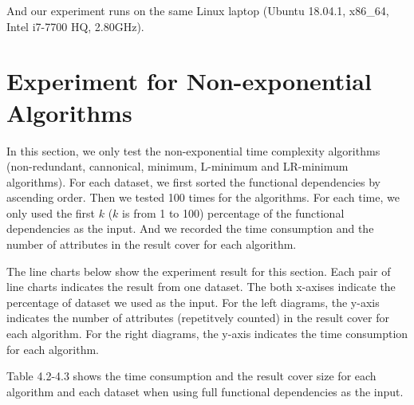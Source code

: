 \documentclass[11pt]{book}
\begin{document}
And our experiment runs on the same Linux laptop (Ubuntu 18.04.1, x86\_64, Intel i7-7700 HQ, 2.80GHz).

\section{Experiment for Non-exponential Algorithms}

In this section, we only test the non-exponential time complexity algorithms (non-redundant, cannonical, minimum, L-minimum and LR-minimum algorithms). For each dataset, we first sorted the functional dependencies by ascending order. Then we tested 100 times for the algorithms. For each time, we only used the first $k$ ($k$ is from 1 to 100) percentage of the functional dependencies as the input. And we recorded the time consumption and the number of attributes in the result cover for each algorithm.

The line charts below show the experiment result for this section. Each pair of line charts indicates the result from one dataset. The both x-axises indicate the percentage of dataset we used as the input. For the left diagrams, the y-axis indicates the number of attributes (repetitvely counted) in the result cover for each algorithm. For the right diagrams, the y-axis indicates the time consumption for each algorithm.

Table 4.2-4.3 shows the time consumption and the result cover size for each algorithm and each dataset when using full functional dependencies as the input.
\end{document}
